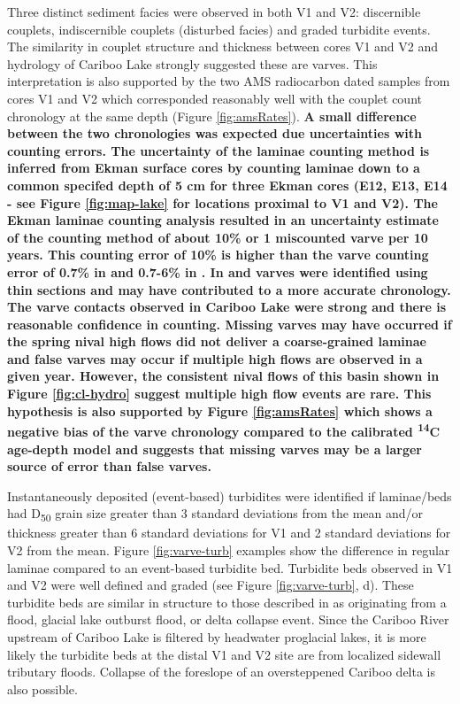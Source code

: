\documentclass[Royal,times,doublespace,sageh]{sagej}
\begin{document}
Three distinct sediment facies were observed in both V1 and V2:
discernible couplets, indiscernible couplets (disturbed facies) and
graded turbidite events. The similarity in couplet structure and
thickness between cores V1 and V2 and hydrology of Cariboo Lake strongly
suggested these are varves. This interpretation is also supported by the
two AMS radiocarbon dated samples from cores V1 and V2 which
corresponded reasonably well with the couplet count chronology at the
same depth (Figure \ref{fig:amsRates}). \textbf{A small difference
between the two chronologies was expected due uncertainties with
counting errors. The uncertainty of the laminae counting method is
inferred from Ekman surface cores by counting laminae down to a common
specifed depth of 5 cm for three Ekman cores (E12, E13, E14 - see Figure
\ref{fig:map-lake} for locations proximal to V1 and V2). The Ekman
laminae counting analysis resulted in an uncertainty estimate of the
counting method of about 10\% or 1 miscounted varve per 10 years. This
counting error of 10\% is higher than the varve counting error of 0.7\%
in \citet{Menounos2008c} and 0.7-6\% in \citet{Zolitschka1991}. In
\citet{Menounos2008c} and \citet{Zolitschka1991} varves were identified
using thin sections and may have contributed to a more accurate
chronology. The varve contacts observed in Cariboo Lake were strong and
there is reasonable confidence in counting. Missing varves may have
occurred if the spring nival high flows did not deliver a coarse-grained
laminae and false varves may occur if multiple high flows are observed
in a given year. However, the consistent nival flows of this basin shown
in Figure \ref{fig:cl-hydro} suggest multiple high flow events are rare.
This hypothesis is also supported by Figure \ref{fig:amsRates} which
shows a negative bias of the varve chronology compared to the calibrated
\textsuperscript{14}C age-depth model and suggests that missing varves
may be a larger source of error than false varves.}

Instantaneously deposited (event-based) turbidites were identified if
laminae/beds had D\textsubscript{50} grain size greater than 3 standard
deviations from the mean and/or thickness greater than 6 standard
deviations for V1 and 2 standard deviations for V2 from the mean. Figure
\ref{fig:varve-turb} examples show the difference in regular laminae
compared to an event-based turbidite bed. Turbidite beds observed in V1
and V2 were well defined and graded (see Figure \ref{fig:varve-turb},
d). These turbidite beds are similar in structure to those described in
\citet{sabatier2022} as originating from a flood, glacial lake outburst
flood, or delta collapse event. Since the Cariboo River upstream of
Cariboo Lake is filtered by headwater proglacial lakes, it is more
likely the turbidite beds at the distal V1 and V2 site are from
localized sidewall tributary floods. Collapse of the foreslope of an
oversteppened Cariboo delta is also possible.
\end{document}
